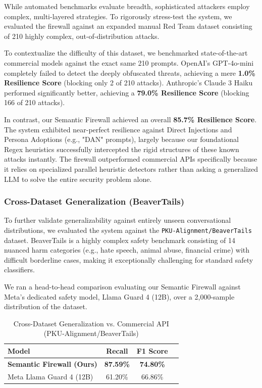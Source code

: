 \documentclass[12pt,a4paper]{article}
\begin{document}
While automated benchmarks evaluate breadth, sophisticated attackers employ complex, multi-layered strategies. To rigorously stress-test the system, we evaluated the firewall against an expanded manual Red Team dataset consisting of 210 highly complex, out-of-distribution attacks.

To contextualize the difficulty of this dataset, we benchmarked state-of-the-art commercial models against the exact same 210 prompts. OpenAI's GPT-4o-mini completely failed to detect the deeply obfuscated threats, achieving a mere \textbf{1.0\% Resilience Score} (blocking only 2 of 210 attacks). Anthropic's Claude 3 Haiku performed significantly better, achieving a \textbf{79.0\% Resilience Score} (blocking 166 of 210 attacks). 

In contrast, our Semantic Firewall achieved an overall \textbf{85.7\% Resilience Score}. The system exhibited near-perfect resilience against Direct Injections and Persona Adoptions (e.g., "DAN" prompts), largely because our foundational Regex heuristics successfully intercepted the rigid structures of these known attacks instantly. The firewall outperformed commercial APIs specifically because it relies on specialized parallel heuristic detectors rather than asking a generalized LLM to solve the entire security problem alone.

\subsubsection{Cross-Dataset Generalization (BeaverTails)}

To further validate generalizability against entirely unseen conversational distributions, we evaluated the system against the \texttt{PKU-Alignment/BeaverTails} dataset. BeaverTails is a highly complex safety benchmark consisting of 14 nuanced harm categories (e.g., hate speech, animal abuse, financial crime) with difficult borderline cases, making it exceptionally challenging for standard safety classifiers.

We ran a head-to-head comparison evaluating our Semantic Firewall against Meta's dedicated safety model, Llama Guard 4 (12B), over a 2,000-sample distribution of the dataset.

\begin{table}[H]
\centering
\caption{Cross-Dataset Generalization vs. Commercial API (PKU-Alignment/BeaverTails)}
\label{tab:beavertails}
\begin{tabular}{@{}lccc@{}}
\toprule
\textbf{Model} & \textbf{Recall} & \textbf{F1 Score} \\
\midrule
\textbf{Semantic Firewall (Ours)} & \textbf{87.59\%} & \textbf{74.80\%} \\
Meta Llama Guard 4 (12B) & 61.20\% & 66.86\% \\
\bottomrule
\end{tabular}
\end{table}
\end{document}

